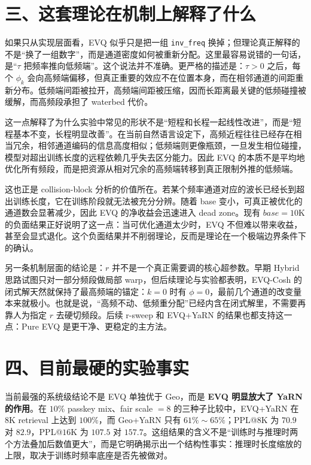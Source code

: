 \documentclass[11pt]{article}
\begin{document}
\section*{三、这套理论在机制上解释了什么}

如果只从实现层面看，EVQ 似乎只是把一组 \texttt{inv\_freq} 换掉；但理论真正解释的不是“换了一组数字”，而是通道密度如何被重新分配。这里最容易说错的一句话，是“\(\tau\) 把频率推向低频端”。这个说法并不准确。更严格的描述是：\(\tau>0\) 之后，每个 \(\phi_k\) 会向高频端偏移，但真正重要的效应不在位置本身，而在相邻通道的间距重新分布。低频端间距被拉开，高频端间距被压缩，因而长距离最关键的低频碰撞被缓解，而高频段承担了 waterbed 代价。

这一点解释了为什么实验中常见的形状不是“短程和长程一起线性改进”，而是“短程基本不变，长程明显改善”。在当前自然语言设定下，高频近程往往已经存在相当冗余，相邻通道编码的信息高度相似；低频端则更像瓶颈，一旦发生相位碰撞，模型对超出训练长度的远程依赖几乎失去区分能力。因此 EVQ 的本质不是平均地优化所有频段，而是把资源从相对冗余的高频端转移到真正限制外推的低频端。

这也正是 collision-block 分析的价值所在。若某个频率通道对应的波长已经长到超出训练长度，它在训练阶段就无法被充分分辨。随着 base 变小，可真正被优化的通道数会显著减少，因此 EVQ 的净收益会迅速进入 dead zone。现有 \(base=10\mathrm K\) 的负面结果正好说明了这一点：当可优化通道太少时，EVQ 不但难以带来收益，甚至会显式退化。这个负面结果并不削弱理论，反而是理论在一个极端边界条件下的确认。

另一条机制层面的结论是：\(r\) 并不是一个真正需要调的核心超参数。早期 Hybrid 思路试图只对一部分频段做局部 warp，但后续理论与实验都表明，EVQ-Cosh 的闭式解天然就保持了最高频端的锚定：\(k=0\) 时有 \(\phi=0\)，最前几个通道的改变量本来就极小。也就是说，“高频不动、低频重分配”已经内含在闭式解里，不需要再靠人为指定 \(r\) 去硬切频段。后续 r-sweep 和 EVQ+YaRN 的结果也都支持这一点：Pure EVQ 是更干净、更稳定的主方法。

\section*{四、目前最硬的实验事实}

当前最强的系统级结论不是 EVQ 单独优于 Geo，而是 \textbf{EVQ 明显放大了 YaRN 的作用}。在 \(10\%\) passkey mix、fair scale \(=8\) 的三种子比较中，EVQ+YaRN 在 \(8\mathrm K\) retrieval 上达到 \(100\%\)，而 Geo+YaRN 只有 \(61\%\sim 65\%\)；PPL@\(8\mathrm K\) 为 \(70.9\) 对 \(82.9\)，PPL@\(16\mathrm K\) 为 \(107.5\) 对 \(157.7\)。这组结果的含义不是“训练时与推理时两个方法叠加后数值更大”，而是它明确揭示出一个结构性事实：推理时长度缩放的上限，取决于训练时频率底座是否先被做对。
\end{document}

